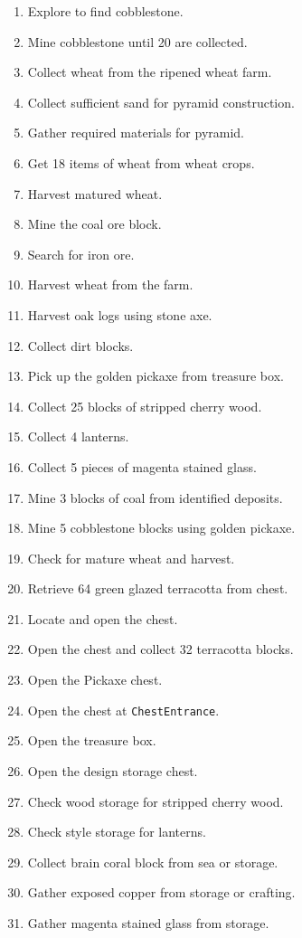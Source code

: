 \begin{small}
\begin{enumerate}
  \item Explore to find cobblestone.
  \item Mine cobblestone until 20 are collected.
  \item Collect wheat from the ripened wheat farm.
  \item Collect sufficient sand for pyramid construction.
  \item Gather required materials for pyramid.
  \item Get 18 items of wheat from wheat crops.
  \item Harvest matured wheat.
  \item Mine the coal ore block.
  \item Search for iron ore.
  \item Harvest wheat from the farm.
  \item Harvest oak logs using stone axe.
  \item Collect dirt blocks.
  \item Pick up the golden pickaxe from treasure box.
  \item Collect 25 blocks of stripped cherry wood.
  \item Collect 4 lanterns.
  \item Collect 5 pieces of magenta stained glass.
  \item Mine 3 blocks of coal from identified deposits.
  \item Mine 5 cobblestone blocks using golden pickaxe.
  \item Check for mature wheat and harvest.
  \item Retrieve 64 green glazed terracotta from chest.
  \item Locate and open the chest.
  \item Open the chest and collect 32 terracotta blocks.
  \item Open the Pickaxe chest.
  \item Open the chest at \texttt{ChestEntrance}.
  \item Open the treasure box.
  \item Open the design storage chest.
  \item Check wood storage for stripped cherry wood.
  \item Check style storage for lanterns.
  \item Collect brain coral block from sea or storage.
  \item Gather exposed copper from storage or crafting.
  \item Gather magenta stained glass from storage.

\end{enumerate}
\end{small}
